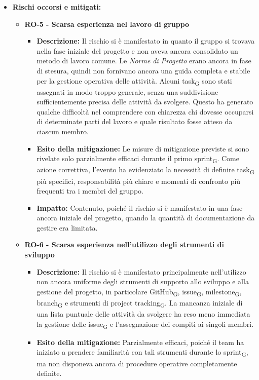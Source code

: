 \documentclass[a4paper, 10pt, colorlinks=true, linkcolor=black, urlcolor=blue, citecolor=blue, hidelinks]{article}
\begin{document}
\begin{itemize}
    \item \textbf{Rischi occorsi e mitigati:}
    \begin{itemize}
        \item \textbf{RO-5 - Scarsa esperienza nel lavoro di gruppo}
        \begin{itemize}
            \item \textbf{Descrizione:} Il rischio si è manifestato in quanto il gruppo si trovava nella fase iniziale del progetto e non aveva ancora consolidato un metodo di lavoro comune. Le \textit{Norme di Progetto} erano ancora in fase di stesura, quindi non fornivano ancora una guida completa e stabile per la gestione operativa delle attività. Alcuni task\textsubscript{G} sono stati assegnati in modo troppo generale, senza una suddivisione sufficientemente precisa delle attività da svolgere. Questo ha generato qualche difficoltà nel comprendere con chiarezza chi dovesse occuparsi di determinate parti del lavoro e quale risultato fosse atteso da ciascun membro.
            \item \textbf{Esito della mitigazione:} Le misure di mitigazione previste si sono rivelate solo parzialmente efficaci durante il primo sprint\textsubscript{G}. Come azione correttiva, l'evento ha evidenziato la necessità di definire task\textsubscript{G} più specifici, responsabilità più chiare e momenti di confronto più frequenti tra i membri del gruppo.
            \item \textbf{Impatto:} Contenuto, poiché il rischio si è manifestato in una fase ancora iniziale del progetto, quando la quantità di documentazione da gestire era limitata.
        \end{itemize}
        \item \textbf{RO-6 - Scarsa esperienza nell'utilizzo degli strumenti di sviluppo}
        \begin{itemize}
            \item \textbf{Descrizione:} Il rischio si è manifestato principalmente nell'utilizzo non ancora uniforme degli strumenti di supporto allo sviluppo e alla gestione del progetto, in particolare GitHub\textsubscript{G}, issue\textsubscript{G}, milestone\textsubscript{G}, branch\textsubscript{G} e strumenti di project tracking\textsubscript{G}. La mancanza iniziale di una lista puntuale delle attività da svolgere ha reso meno immediata la gestione delle issue\textsubscript{G} e l'assegnazione dei compiti ai singoli membri.
            \item \textbf{Esito della mitigazione:} Parzialmente efficaci, poiché il team ha iniziato a prendere familiarità con tali strumenti durante lo sprint\textsubscript{G}, ma non disponeva ancora di procedure operative completamente definite.

\end{itemize}
\end{itemize}
\end{itemize}
\end{document}
